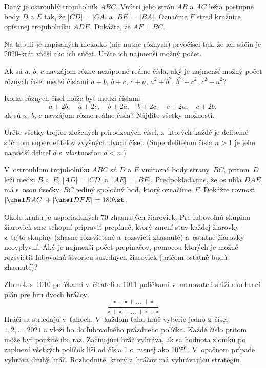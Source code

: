 {%
Daný je ostrouhlý trojuholník $ABC$. Vnútri jeho strán $AB$ a $AC$ ležia
postupne body $D$ a $E$ tak, že $|CD|=|CA|$ a $|BE|=|BA|$. Označme
$F$ stred kružnice opísanej trojuholníku $ADE$. Dokážte, že $AF\perp BC$.
}

{%
Na tabuli je napísaných niekoľko (nie nutne rôznych) prvočísel tak, že
ich súčin je 2020-krát väčší ako ich súčet. Určte
ich najmenší možný počet.
}

{%
Ak sú $a$, $b$, $c$ navzájom rôzne nezáporné reálne čísla, aký je
najmenší možný počet rôznych čísel medzi číslami
$a+b$, $b+c$, $c+a$, $a^2+b^2$, $b^2+c^2$, $c^2+a^2$?}

{%
Koľko rôznych čísel môže byť medzi číslami
$$
a+2b,\quad a+2c,\quad b+2a,\quad b+2c,\quad c+2a,\quad c+2b,
$$
ak sú $a$, $b$, $c$ navzájom rôzne reálne čísla? Nájdite všetky možnosti.
}

{%
Určte všetky trojice zložených prirodzených čísel, z~ktorých každé
je deliteľné súčinom superdeliteľov zvyšných dvoch čísel.
(Superdeliteľom čísla $n>1$ je jeho najväčší deliteľ $d$
s~vlastnosťou $d<n$.)}

{%
V~ostrouhlom trojuholníku $ABC$ sú $D$ a $E$ vnútorné body strany~$BC$,
pritom~$D$ leží medzi $B$ a~$E$, $|AD|=|CD|$ a~$|AE|=|BE|$.
Predpokladajme, že os uhla $DAE$ má s~osou úsečky~$BC$ jediný
spoločný bod, ktorý označíme~$F$. Dokážte rovnosť
$|\uhel BAC|+|\uhel DFE|=180\st$.
}

{%
Okolo kruhu je usporiadaných 70 zhasnutých žiaroviek. Pre ľubovoľnú skupinu
žiaroviek sme schopní pripraviť prepínač,
ktorý zmení stav každej žiarovky z~tejto skupiny (zhasne
rozsvietené a~rozsvieti zhasnuté) a~ostatné žiarovky neovplyvní.
Aký je najmenší počet prepínačov, pomocou ktorých je
možné rozsvietiť ľubovoľnú štvoricu susedných žiaroviek (pričom ostatné budú
zhasnuté)?}

{%
Zlomok s~1010 políčkami v~čitateli a 1011 políčkami v~menovateli slúži ako hrací plán pre hru dvoch hráčov.
$$
\frac{\square+\square+\dots+\square}
{\square+\square+\dots+\square+\square}
$$
Hráči sa striedajú v~ťahoch. V~každom ťahu hráč vyberie jedno
z~čísel $1,2, \dots, 2021$ a vloží ho do ľubovoľného prázdneho
políčka. Každé číslo pritom môže byť použité iba raz.
Začínajúci hráč vyhráva, ak sa hodnota zlomku po zaplnení
všetkých políčok líši od čísla $1$ o~menej ako $10^{\m6}$. V~opačnom
prípade vyhráva druhý hráč. Rozhodnite, ktorý z~hráčov má vyhrávajúcu
stratégiu.}

